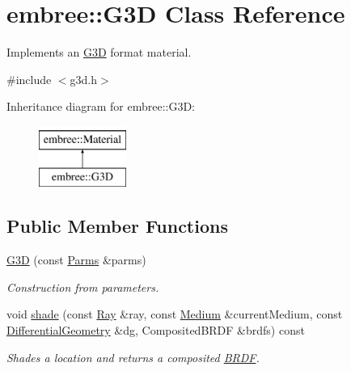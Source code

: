 \hypertarget{classembree_1_1_g3_d}{
\section{embree::G3D Class Reference}
\label{classembree_1_1_g3_d}
}


Implements an \hyperlink{classembree_1_1_g3_d}{G3D} format material.  




{\ttfamily \#include $<$g3d.h$>$}

Inheritance diagram for embree::G3D:\begin{figure}[H]
\begin{center}
\leavevmode
\includegraphics[height=2.000000cm]{classembree_1_1_g3_d}
\end{center}
\end{figure}
\subsection*{Public Member Functions}
\begin{DoxyCompactItemize}
\item 
\hyperlink{classembree_1_1_g3_d_ab36119540b53ff8b6d726759aa451682}{G3D} (const \hyperlink{classembree_1_1_parms}{Parms} \&parms)
\begin{DoxyCompactList}\small\item\em Construction from parameters. \item\end{DoxyCompactList}\item 
void \hyperlink{classembree_1_1_g3_d_a03fd4021f086a07c713848a3d3d1bd97}{shade} (const \hyperlink{structembree_1_1_ray}{Ray} \&ray, const \hyperlink{classembree_1_1_medium}{Medium} \&currentMedium, const \hyperlink{structembree_1_1_differential_geometry}{DifferentialGeometry} \&dg, CompositedBRDF \&brdfs) const 
\begin{DoxyCompactList}\small\item\em Shades a location and returns a composited \hyperlink{classembree_1_1_b_r_d_f}{BRDF}. \item\end{DoxyCompactList}\end{DoxyCompactItemize}


